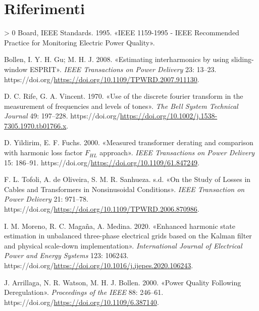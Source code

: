 \documentclass[
  italian,
]{article}
\newlength{\cslhangindent}
\newenvironment{CSLReferences}[3] %
 {%
  \setlength{\parindent}{0pt}
  \ifodd #1 \everypar{\setlength{\hangindent}{\cslhangindent}}\ignorespaces\fi
  \ifnum #2 > 0
  \setlength{\parskip}{#3\baselineskip}
  \fi
 }%
 {}
\begin{document}
\newpage

\hypertarget{riferimenti}{%
\section*{Riferimenti}\label{riferimenti}}

\hypertarget{refs}{}
\begin{CSLReferences}{1}{0}
\leavevmode\hypertarget{ref-ieee-1159}{}%
Board, IEEE Standards. 1995. {«{IEEE} 1159-1995 - {IEEE} Recommended
Practice for Monitoring Electric Power Quality»}.

\leavevmode\hypertarget{ref-sliding-window-esprit}{}%
Bollen, I. Y. H. Gu; M. H. J. 2008. {«Estimating interharmonics by using
sliding-window {ESPRIT}»}. \emph{{IEEE} Transactions on Power Delivery}
23: 13--23.
https://doi.org/\url{https://doi.org/10.1109/TPWRD.2007.911130}.

\leavevmode\hypertarget{ref-ifft-original}{}%
D. C. Rife, G. A. Vincent. 1970. {«Use of the discrete fourier transform
in the measurement of frequencies and levels of tones»}. \emph{The Bell
System Technical Journal} 49: 197--228.
https://doi.org/\url{https://doi.org/10.1002/j.1538-7305.1970.tb01766.x}.

\leavevmode\hypertarget{ref-transformer-harmonic-loss}{}%
D. Yildirim, E. F. Fuchs. 2000. {«Measured transformer derating and
comparison with harmonic loss factor \(F_{HL}\) approach»}. \emph{{IEEE}
Transactions on Power Delivery} 15: 186--91.
https://doi.org/\url{https://doi.org/10.1109/61.847249}.

\leavevmode\hypertarget{ref-losses-cables}{}%
F. L. Tofoli, A. de Oliveira, S. M. R. Sanhueza. s.d. {«On the Study of
Losses in Cables and Transformers in Nonsinusoidal Conditions»}.
\emph{{IEEE} Transaction on Power Delivery} 21: 971--78.
https://doi.org/\url{https://doi.org/10.1109/TPWRD.2006.870986}.

\leavevmode\hypertarget{ref-state-est-kalman}{}%
I. M. Moreno, R. C. Magaña, A. Medina. 2020. {«Enhanced harmonic state
estimation in unbalanced three-phase electrical grids based on the
Kalman filter and physical scale-down implementation»}.
\emph{International Journal of Electrical Power and Energy Systems} 123:
106243.
https://doi.org/\url{https://doi.org/10.1016/j.ijepes.2020.106243}.

\leavevmode\hypertarget{ref-power-quality-deregulation}{}%
J. Arrillaga, N. R. Watson, M. H. J. Bollen. 2000. {«Power Quality
Following Deregulation»}. \emph{Proceedings of the {IEEE}} 88: 246--61.
https://doi.org/\url{https://doi.org/10.1109/6.387140}.


\end{CSLReferences}
\end{document}
